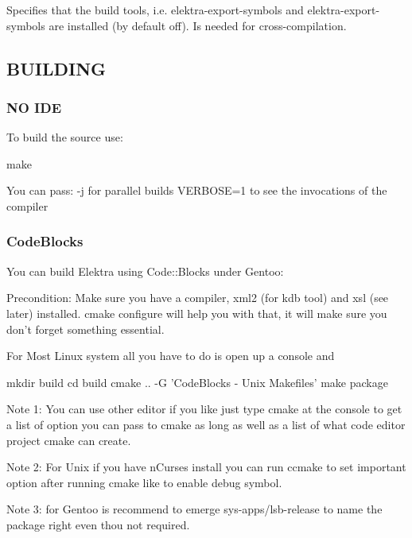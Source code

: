 Specifies that the build tools, i.\+e. {\ttfamily elektra-\/export-\/symbols} and {\ttfamily elektra-\/export-\/symbols} are installed (by default off). Is needed for cross-\/compilation.

\subsection*{B\+U\+I\+L\+D\+I\+N\+G}

\subsubsection*{N\+O I\+D\+E}

To build the source use\+: \begin{DoxyVerb}make
\end{DoxyVerb}


You can pass\+: -\/j for parallel builds V\+E\+R\+B\+O\+S\+E=1 to see the invocations of the compiler

\subsubsection*{Code\+Blocks}

You can build Elektra using Code\+::\+Blocks under Gentoo\+:

Precondition\+: Make sure you have a compiler, xml2 (for kdb tool) and xsl (see later) installed. cmake configure will help you with that, it will make sure you don't forget something essential.

For Most Linux system all you have to do is open up a console and \begin{DoxyVerb}    mkdir build
    cd build
    cmake .. -G 'CodeBlocks - Unix Makefiles'
    make package
\end{DoxyVerb}


Note 1\+: You can use other editor if you like just type cmake at the console to get a list of option you can pass to cmake as long as well as a list of what code editor project cmake can create.

Note 2\+: For Unix if you have n\+Curses install you can run ccmake to set important option after running cmake like to enable debug symbol.

Note 3\+: for Gentoo is recommend to emerge sys-\/apps/lsb-\/release to name the package right even thou not required. 